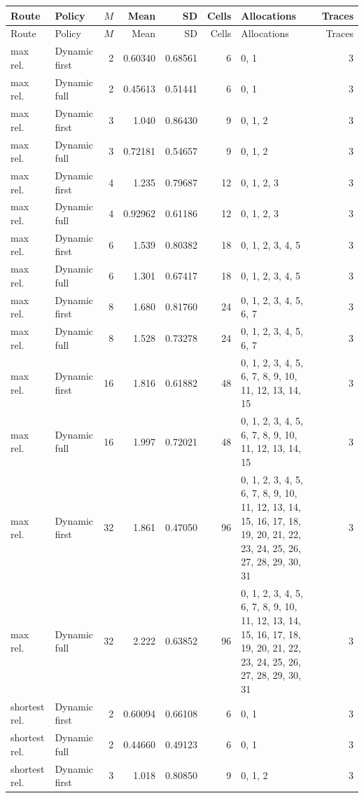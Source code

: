 \documentclass[10pt,a4paper]{article}
\begin{document}
\tiny\setlength{\tabcolsep}{2pt}\begin{longtable}{@{}p{23mm}p{29mm}rrrrp{36mm}r@{}}
\toprule Route & Policy & $M$ & Mean & SD & Cells & Allocations & Traces \\ \midrule\endfirsthead
\toprule Route & Policy & $M$ & Mean & SD & Cells & Allocations & Traces \\ \midrule\endhead
\bottomrule\endfoot
max rel. & Dynamic first & 2 & 0.60340 & 0.68561 & 6 & 0, 1 & 3 \\
max rel. & Dynamic full & 2 & 0.45613 & 0.51441 & 6 & 0, 1 & 3 \\
max rel. & Dynamic first & 3 & 1.040 & 0.86430 & 9 & 0, 1, 2 & 3 \\
max rel. & Dynamic full & 3 & 0.72181 & 0.54657 & 9 & 0, 1, 2 & 3 \\
max rel. & Dynamic first & 4 & 1.235 & 0.79687 & 12 & 0, 1, 2, 3 & 3 \\
max rel. & Dynamic full & 4 & 0.92962 & 0.61186 & 12 & 0, 1, 2, 3 & 3 \\
max rel. & Dynamic first & 6 & 1.539 & 0.80382 & 18 & 0, 1, 2, 3, 4, 5 & 3 \\
max rel. & Dynamic full & 6 & 1.301 & 0.67417 & 18 & 0, 1, 2, 3, 4, 5 & 3 \\
max rel. & Dynamic first & 8 & 1.680 & 0.81760 & 24 & 0, 1, 2, 3, 4, 5, 6, 7 & 3 \\
max rel. & Dynamic full & 8 & 1.528 & 0.73278 & 24 & 0, 1, 2, 3, 4, 5, 6, 7 & 3 \\
max rel. & Dynamic first & 16 & 1.816 & 0.61882 & 48 & 0, 1, 2, 3, 4, 5, 6, 7, 8, 9, 10, 11, 12, 13, 14, 15 & 3 \\
max rel. & Dynamic full & 16 & 1.997 & 0.72021 & 48 & 0, 1, 2, 3, 4, 5, 6, 7, 8, 9, 10, 11, 12, 13, 14, 15 & 3 \\
max rel. & Dynamic first & 32 & 1.861 & 0.47050 & 96 & 0, 1, 2, 3, 4, 5, 6, 7, 8, 9, 10, 11, 12, 13, 14, 15, 16, 17, 18, 19, 20, 21, 22, 23, 24, 25, 26, 27, 28, 29, 30, 31 & 3 \\
max rel. & Dynamic full & 32 & 2.222 & 0.63852 & 96 & 0, 1, 2, 3, 4, 5, 6, 7, 8, 9, 10, 11, 12, 13, 14, 15, 16, 17, 18, 19, 20, 21, 22, 23, 24, 25, 26, 27, 28, 29, 30, 31 & 3 \\
shortest rel. & Dynamic first & 2 & 0.60094 & 0.66108 & 6 & 0, 1 & 3 \\
shortest rel. & Dynamic full & 2 & 0.44660 & 0.49123 & 6 & 0, 1 & 3 \\
shortest rel. & Dynamic first & 3 & 1.018 & 0.80850 & 9 & 0, 1, 2 & 3 \\

\end{longtable}
\end{document}
